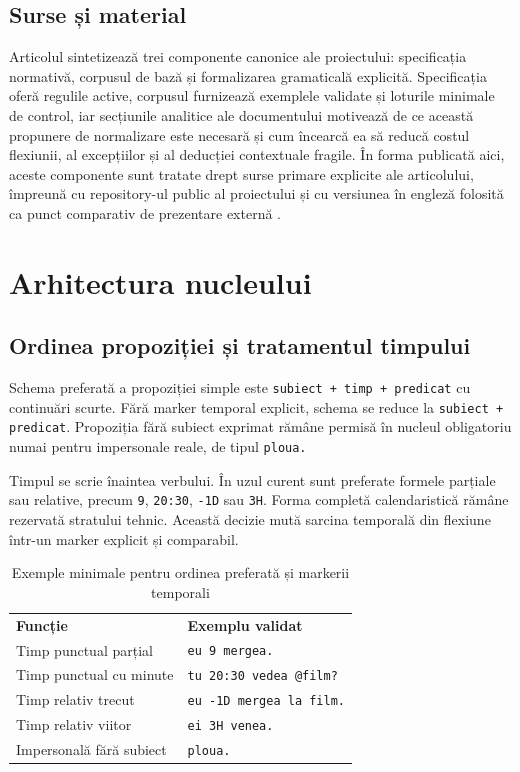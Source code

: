 \documentclass[12pt,onecolumn,letterpaper]{article}
\newcommand{\rs}[1]{\texttt{#1}}
\newcommand{\RStablelayout}{%
\footnotesize
\setlength{\tabcolsep}{6pt}%
\renewcommand{\arraystretch}{1.12}%
\arrayrulecolor{RSRule}%
}
\begin{document}
\subsection{Surse și material}

Articolul sintetizează trei componente canonice ale proiectului: specificația
normativă, corpusul de bază și formalizarea gramaticală explicită. Specificația
oferă regulile active, corpusul furnizează exemplele validate și loturile
minimale de control, iar secțiunile analitice ale documentului motivează de ce
această propunere de normalizare este necesară și cum încearcă ea să reducă
costul flexiunii, al excepțiilor și al deducției contextuale fragile. În forma
publicată aici, aceste componente sunt tratate drept surse primare explicite ale
articolului, împreună cu repository-ul public al proiectului și cu versiunea în
engleză folosită ca punct comparativ de prezentare externă
\cite{rs-spec,rs-corpus,rs-eval,rs-prez,rs-readme,rs-repo,minenglish}.

\section{Arhitectura nucleului}

\subsection{Ordinea propoziției și tratamentul timpului}

Schema preferată a propoziției simple este \rs{subiect + timp + predicat}
cu continuări scurte. Fără marker temporal explicit, schema se reduce la
\rs{subiect + predicat}. Propoziția fără subiect exprimat rămâne permisă în
nucleul obligatoriu numai pentru impersonale reale, de tipul \rs{ploua.}

Timpul se scrie înaintea verbului. În uzul curent sunt preferate formele parțiale
sau relative, precum \rs{9}, \rs{20:30}, \rs{-1D} sau \rs{3H}. Forma completă
calendaristică rămâne rezervată stratului tehnic. Această decizie mută sarcina
temporală din flexiune într-un marker explicit și comparabil.

\begin{table}[h!]
\centering
\RStablelayout
\begin{tabularx}{\linewidth}{@{}lY@{}}
\textbf{Funcție} & \textbf{Exemplu validat} \\
Timp punctual parțial & \rs{eu 9 mergea.} \\
Timp punctual cu minute & \rs{tu 20:30 vedea @film?} \\
Timp relativ trecut & \rs{eu -1D mergea la film.} \\
Timp relativ viitor & \rs{ei 3H venea.} \\
Impersonală fără subiect & \rs{ploua.} \\
\bottomrule
\end{tabularx}
\caption{Exemple minimale pentru ordinea preferată și markerii temporali}
\end{table}
\end{document}
